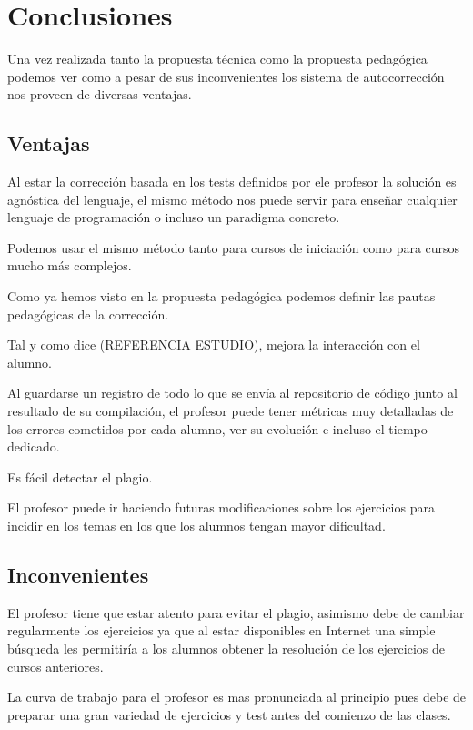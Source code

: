 \chapter{Conclusiones}

Una vez realizada tanto la propuesta técnica como la propuesta pedagógica podemos ver como a pesar de sus inconvenientes los sistema de autocorrección nos proveen de diversas ventajas.

\section{Ventajas}

Al estar la corrección basada en los tests definidos por ele profesor la solución es agnóstica del lenguaje, el mismo método nos puede servir para enseñar cualquier lenguaje de programación o incluso un paradigma concreto.

Podemos usar el mismo método tanto para cursos de iniciación como para cursos mucho más complejos.

Como ya hemos visto en la propuesta pedagógica podemos definir las pautas pedagógicas de la corrección.

Tal y como dice (REFERENCIA ESTUDIO), mejora la interacción con el alumno.

Al guardarse un registro de todo lo que se envía al repositorio de código junto al resultado de su compilación, el profesor puede tener métricas muy detalladas de los errores cometidos por cada alumno, ver su evolución e incluso el tiempo dedicado.

Es fácil detectar el plagio.

El profesor puede ir haciendo futuras modificaciones sobre los ejercicios para incidir en los temas en los que los alumnos tengan mayor dificultad.


\section{Inconvenientes}

El profesor tiene que estar atento para evitar el plagio, asimismo debe de cambiar regularmente los ejercicios ya que al estar disponibles en Internet una simple búsqueda les permitiría a los alumnos obtener la resolución de los ejercicios de cursos anteriores.

La curva de trabajo para el profesor es mas pronunciada al principio pues debe de preparar una gran variedad de ejercicios y test antes del comienzo de las clases.



